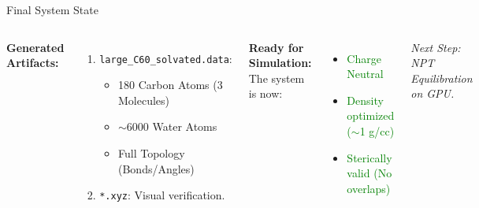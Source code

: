 \documentclass[aspectratio=169, 10pt]{beamer}
\begin{document}


\begin{frame}{Final System State}
    \begin{columns}
        \textbf{Generated Artifacts:}
        \begin{enumerate}
            \item \texttt{large\_C60\_solvated.data}:
            \begin{itemize}
                \item 180 Carbon Atoms (3 Molecules)
                \item $\sim$6000 Water Atoms
                \item Full Topology (Bonds/Angles)
            \end{itemize}
            \item \texttt{*.xyz}: Visual verification.
        \end{enumerate}

        \centering
        \textbf{Ready for Simulation:} \\
        The system is now:
        \begin{itemize}
            \item \textcolor{green}{Charge Neutral}
            \item \textcolor{green}{Density optimized ($\sim$1 g/cc)}
            \item \textcolor{green}{Sterically valid (No overlaps)}
        \end{itemize}
        
        \vspace{0.5cm}
        \textit{Next Step: NPT Equilibration on GPU.}
    \end{columns}
\end{frame}
\end{document}

